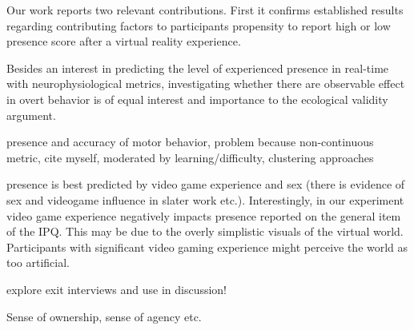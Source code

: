Our work reports two relevant contributions. First it confirms established results regarding contributing factors to participants propensity to report high or low presence score after a virtual reality experience.

Besides an interest in predicting the level of experienced presence in real-time with neurophysiological metrics, investigating whether there are observable effect in overt behavior is of equal interest and importance to the ecological validity argument.


presence and accuracy of motor behavior, problem because non-continuous metric, cite myself, moderated by learning/difficulty, clustering approaches

presence is best predicted by video game experience and sex (there is evidence of sex and videogame influence in slater work etc.). Interestingly, in our experiment video game experience negatively impacts presence reported on the general item of the IPQ. This may be due to the overly simplistic visuals of the virtual world. Participants with significant video gaming experience might perceive the world as too artificial.

explore exit interviews and use in discussion!

Sense of ownership, sense of agency etc.

